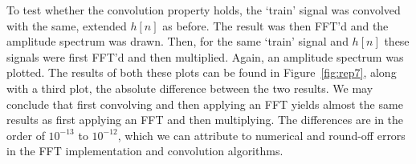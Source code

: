 \documentclass[11pt,titlepage]{report}
\begin{document}
To test whether the convolution property holds, the `train' signal was convolved with the same, extended $h[n]$ as before. The result was then FFT'd and the amplitude spectrum was drawn. Then, for the same `train' signal and $h[n]$ these signals were first FFT'd and then multiplied. Again, an amplitude spectrum was plotted. The results of both these plots can be found in Figure~\ref{fig:rep7}, along with a third plot, the absolute difference between the two results. We may conclude that first convolving and then applying an FFT yields almost the same results as first applying an FFT and then multiplying. The differences are in the order of $10^{-13}$ to $10^{-12}$, which we can attribute to numerical and round-off errors in the FFT implementation and convolution algorithms.
\end{document}
